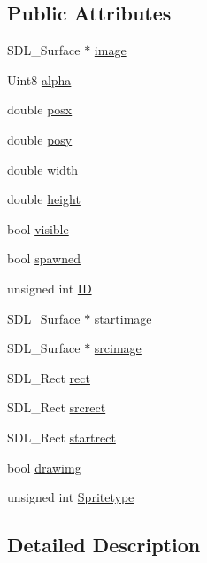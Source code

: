 \subsection*{Public Attributes}
\begin{DoxyCompactItemize}
\item 
S\-D\-L\-\_\-\-Surface $\ast$ \hyperlink{classc_basic_sprite_af504a7d23fed0ba6975f701e2a056dd7}{image}
\item 
Uint8 \hyperlink{classc_basic_sprite_ad0eff9f7fd9db3496da83a65d625983c}{alpha}
\item 
double \hyperlink{classc_basic_sprite_a2c05526f8e98074b549e692822ab49b2}{posx}
\item 
double \hyperlink{classc_basic_sprite_a9372069c238077090f0dd7a4e5c27e98}{posy}
\item 
double \hyperlink{classc_basic_sprite_a99d40d0360fb5a3791c62240d65b677c}{width}
\item 
double \hyperlink{classc_basic_sprite_a088106d3526c96d42f8a951f7ccf8b80}{height}
\item 
bool \hyperlink{classc_basic_sprite_a1af0eebcb86cb160a384fb8acea2d773}{visible}
\item 
bool \hyperlink{classc_basic_sprite_ae82550ad1ec25aaf8b61e78afb3abc9d}{spawned}
\item 
unsigned int \hyperlink{classc_basic_sprite_a3afad558641ff5577c51c1b89cb1a871}{I\-D}
\item 
S\-D\-L\-\_\-\-Surface $\ast$ \hyperlink{classc_basic_sprite_abbe64a52b3e23c03246631e63382d1d5}{startimage}
\item 
S\-D\-L\-\_\-\-Surface $\ast$ \hyperlink{classc_basic_sprite_afd756d967421277013a3af729860d434}{srcimage}
\item 
S\-D\-L\-\_\-\-Rect \hyperlink{classc_basic_sprite_a6f5d45a0db04ae6c516f88ccd3ec83ad}{rect}
\item 
S\-D\-L\-\_\-\-Rect \hyperlink{classc_basic_sprite_a595a3142b6008d8484a91c44ea5f0e8f}{srcrect}
\item 
S\-D\-L\-\_\-\-Rect \hyperlink{classc_basic_sprite_ad29c8fafc2c544c30cf028a58e93d063}{startrect}
\item 
bool \hyperlink{classc_basic_sprite_a80fbb5b9f21f36769c2a7992994a0042}{drawimg}
\item 
unsigned int \hyperlink{classc_basic_sprite_a7bf47e784956a031db06a3f768b688f4}{Spritetype}
\end{DoxyCompactItemize}


\subsection{Detailed Description}


